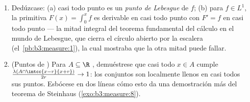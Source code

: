 \begin{problem}
\begin{enumerate}[resume]
{        . En general,
        escríbase $f
        = g + h$ con $g$ 
        de soporte ,
        $\norm h_1 < \varepsilon$
        (el~\cref{thm:b3:lp:density}); el conjunto donde
        $\limsup_{r\to0}$ de la oscilación promediada supera $\delta$
        está dentro de $\{Mh > \delta/2\} \cup \{\abs h
        > \delta/2\}$, de 
        $O(\varepsilon/\delta)$; hágase $\varepsilon \to 0$ y después
        $\delta \to 0$ a lo largo de una sucesión.)} \item Dedúzcase:
        (a) casi todo punto es un \emph{punto de Lebesgue} de $f$; (b)
        para $f \in L^1$, la primitiva $F(x) = \int_0^xf$ es derivable
        en casi todo punto con $F' =
        f$ en casi todo punto --- la mitad integral del teorema
        fundamental del cálculo en el mundo de Lebesgue, que cierra el
        círculo abierto por la escalera (el~\cref{pb:b3:measure:1}), la
        cual mostraba que la otra mitad puede fallar. \item (Puntos de
        ) Para $A \subseteq \R$
        , demuéstrese que
        casi todo $x \in A$ cumple
        $\frac{\lambda(A\cap\intcc{x-r}{x+r})}{2r} \to 1$:
        los conjuntos  son
        localmente llenos en casi todos sus puntos. Esbócese en dos
        líneas cómo esto da una demostración más del teorema de
        Steinhaus
        (\cref{exo:b3:measure:8}).
\end{enumerate}


\end{problem}
